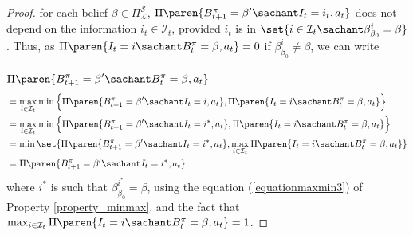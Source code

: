 \begin{proof}
for each belief $\beta \in \Pi^{\mathcal{S}}_{\mathcal{L}}$,
$\Pi \paren{ B^{\pi}_{t+1} = \beta' \sachant I_t=i_t, a_t }$ 
does not depend on the information $i_t \in \mathcal{I}_t$, 
provided $i_t$ is in $\set{ i \in \mathcal{I}_t \sachant \beta^{i}_{\beta_0} = \beta }$.
Thus, as $\Pi \paren{ I_t = i \sachant B^{\pi}_t=\beta, a_t } = 0$ if $\beta_{\beta_0}^{i} \neq \beta$,
we can write \\
\\
$ \displaystyle \Pi \paren{ B^{\pi}_{t+1} = \beta' \sachant B^{\pi}_{t}=\beta, a_t }$
\begin{align*}
 &= \max_{i \in \mathcal{I}_{t}} \min \Big\{ \Pi \paren{ B^{\pi}_{t+1} = \beta' \sachant I_t=i, a_t }, \Pi \paren{ I_t = i \sachant B^{\pi}_t=\beta, a_t } \Big\}\\
 &= \max_{i \in \mathcal{I}_{t}} \min \Big\{ \Pi \paren{ B^{\pi}_{t+1} = \beta' \sachant I_t=i^*, a_t }, \Pi \paren{ I_t = i \sachant B^{\pi}_t=\beta, a_t } \Big\}\\
&= \min \set{ \Pi \paren{ B^{\pi}_{t+1} = \beta' \sachant I_t=i^*, a_t }, \max_{i \in \mathcal{I}_{t}} \Pi \paren{ I_t = i \sachant B^{\pi}_t=\beta, a_t } }\\
&=  \Pi \paren{ B^{\pi}_{t+1} = \beta' \sachant I_t=i^*, a_t }
\end{align*}
where $i^*$ is such that $\beta_{\beta_0}^{i^*} = \beta$, 
using the equation (\ref{equationmaxmin3}) of Property \ref{property_minmax},
and the fact that $\max_{i \in \mathcal{I}_{t}} \Pi \paren{ I_t = i \sachant B^{\pi}_t=\beta, a_t } = 1$.
\end{proof}


